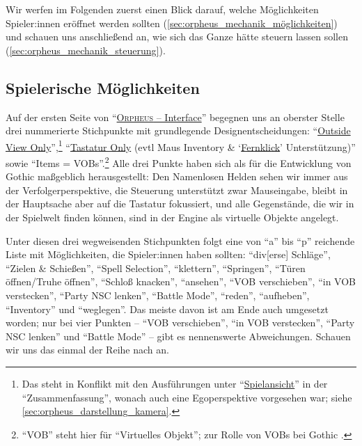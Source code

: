 \documentclass[a5paper,pagesize,numbers=noenddot]{scrbook}
\begin{document}
Wir werfen im Folgenden zuerst einen Blick darauf, welche Möglichkeiten Spieler:innen eröffnet werden sollten (\autoref{sec:orpheus_mechanik_möglichkeiten}) und schauen uns anschließend an, wie sich das Ganze hätte steuern lassen sollen (\autoref{sec:orpheus_mechanik_steuerung}).


\subsection{Spielerische Möglichkeiten}\label{sec:orpheus_mechanik_möglichkeiten}
Auf der ersten Seite von \enquote{\uline{\textsc{Orpheus} -- Interface}} begegnen uns an oberster Stelle drei nummerierte Stichpunkte mit grundlegende Designentscheidungen:
\enquote{\uline{Outside View Only}},\footnote{Das steht in Konflikt mit den Ausführungen unter \enquote{\uline{Spielansicht}} in der \enquote{Zusammenfassung}, wonach auch eine Egoperspektive vorgesehen war; siehe \autoref{sec:orpheus_darstellung_kamera}.} \enquote{\uline{Tastatur Only} (evtl Maus Inventory \& \enquote{\uline{Fernklick}} Unterstützung)} sowie \enquote{Items = VOBs}.\footnote{\enquote{VOB} steht hier für \enquote{Virtuelles Objekt}; zur Rolle von VOBs bei Gothic \autocite[vgl.][]{wiki_vob}.}
Alle drei Punkte haben sich als für die Entwicklung von Gothic maßgeblich herausgestellt:
Den Namenlosen Helden sehen wir immer aus der Verfolgerperspektive, die Steuerung unterstützt zwar Mauseingabe, bleibt in der Hauptsache aber auf die Tastatur fokussiert, und alle Gegenstände, die wir in der Spielwelt finden können, sind in der Engine als virtuelle Objekte angelegt.

Unter diesen drei wegweisenden Stichpunkten folgt eine von \enquote{a} bis \enquote{p} reichende Liste mit Möglichkeiten, die Spieler:innen haben sollten:
\enquote{div[erse] Schläge}, \enquote{Zielen \& Schießen}, \enquote{Spell Selection}, \enquote{klettern}, \enquote{Springen}, \enquote{Türen öffnen/Truhe öffnen}, \enquote{Schloß knacken}, \enquote{ansehen}, \enquote{VOB verschieben}, \enquote{in VOB verstecken}, \enquote{Party NSC lenken}, \enquote{Battle Mode}, \enquote{reden}, \enquote{aufheben}, \enquote{Inventory} und \enquote{weglegen}.
Das meiste davon ist am Ende auch umgesetzt worden; nur bei vier Punkten -- \enquote{VOB verschieben}, \enquote{in VOB verstecken}, \enquote{Party NSC lenken} und \enquote{Battle Mode} -- gibt es nennenswerte Abweichungen.
Schauen wir uns das einmal der Reihe nach an.
\end{document}
